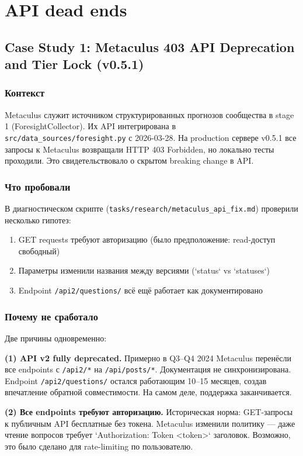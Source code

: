\section{API dead ends}

\subsection{Case Study 1: Metaculus 403 API Deprecation and Tier Lock (v0.5.1)}

\subsubsection*{Контекст}
Metaculus служит источником структурированных прогнозов сообщества в stage 1 (ForesightCollector). Их API интегрирована в \texttt{src/data\_sources/foresight.py} с 2026-03-28. На production сервере v0.5.1 все запросы к Metaculus возвращали HTTP 403 Forbidden, но локально тесты проходили. Это свидетельствовало о скрытом breaking change в API.

\subsubsection*{Что пробовали}
В диагностическом скрипте (\texttt{tasks/research/metaculus\_api\_fix.md}) проверили несколько гипотез:
\begin{enumerate}
\item GET requests требуют авторизацию (было предположение: read-доступ свободный)
\item Параметры изменили названия между версиями (`status` vs `statuses`)
\item Endpoint \texttt{/api2/questions/} всё ещё работает как документировано
\end{enumerate}

\subsubsection*{Почему не сработало}
Две причины одновременно:

\textbf{(1) API v2 fully deprecated.} Примерно в Q3--Q4 2024 Metaculus перенёсли все endpoints с \texttt{/api2/*} на \texttt{/api/posts/*}. Документация не синхронизирована. Endpoint \texttt{/api2/questions/} остался работающим 10--15 месяцев, создав впечатление обратной совместимости. На самом деле, поддержка заканчивается.

\textbf{(2) Все endpoints требуют авторизацию.} Историческая норма: GET-запросы к публичным API бесплатные без токена. Metaculus изменили политику --- даже чтение вопросов требует `Authorization: Token <token>` заголовок. Возможно, это было сделано для rate-limiting по пользователю.

